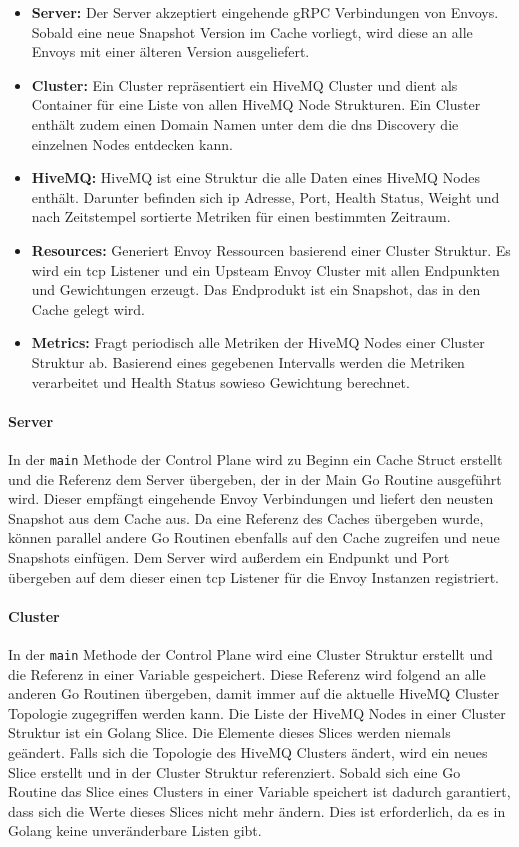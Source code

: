 \begin{itemize}
  \item \textbf{Server:} Der Server akzeptiert eingehende gRPC Verbindungen von Envoys. Sobald eine neue Snapshot Version im Cache vorliegt, wird diese an alle Envoys mit einer älteren Version ausgeliefert.
  \item \textbf{Cluster:} Ein Cluster repräsentiert ein HiveMQ Cluster und dient als Container für eine Liste von allen HiveMQ Node Strukturen. Ein Cluster enthält zudem einen Domain Namen unter dem die \ac{dns} Discovery die einzelnen Nodes entdecken kann.
  \item \textbf{HiveMQ:} HiveMQ ist eine Struktur die alle Daten eines HiveMQ Nodes enthält. Darunter befinden sich \ac{ip} Adresse, Port, Health Status, Weight und nach Zeitstempel sortierte Metriken für einen bestimmten Zeitraum.
  \item \textbf{Resources:} Generiert Envoy Ressourcen basierend einer Cluster Struktur. Es wird ein \ac{tcp} Listener und ein Upsteam Envoy Cluster mit allen Endpunkten und Gewichtungen erzeugt. Das Endprodukt ist ein Snapshot, das in den Cache gelegt wird.
  \item \textbf{Metrics:} Fragt periodisch alle Metriken der HiveMQ Nodes einer Cluster Struktur ab. Basierend eines gegebenen Intervalls werden die Metriken verarbeitet und Health Status sowieso Gewichtung berechnet.
\end{itemize}

\paragraph{Server}
In der \verb|main| Methode der Control Plane wird zu Beginn ein Cache Struct erstellt und die Referenz dem Server übergeben, der in der Main Go Routine ausgeführt wird. Dieser empfängt eingehende Envoy Verbindungen und liefert den neusten Snapshot aus dem Cache aus. Da eine Referenz des Caches übergeben wurde, können parallel andere Go Routinen ebenfalls auf den Cache zugreifen und neue Snapshots einfügen. Dem Server wird au{\ss}erdem ein Endpunkt und Port übergeben auf dem dieser einen \ac{tcp} Listener für die Envoy Instanzen registriert.

\paragraph{Cluster}
In der \verb|main| Methode der Control Plane wird eine Cluster Struktur erstellt und die Referenz in einer Variable gespeichert. Diese Referenz wird folgend an alle anderen Go Routinen übergeben, damit immer auf die aktuelle HiveMQ Cluster Topologie zugegriffen werden kann. Die Liste der HiveMQ Nodes in einer Cluster Struktur ist ein Golang Slice. Die Elemente dieses Slices werden niemals geändert. Falls sich die Topologie des HiveMQ Clusters ändert, wird ein neues Slice erstellt und in der Cluster Struktur referenziert. Sobald sich eine Go Routine das Slice eines Clusters in einer Variable speichert ist dadurch garantiert, dass sich die Werte dieses Slices nicht mehr ändern. Dies ist erforderlich, da es in Golang keine unveränderbare Listen gibt.

